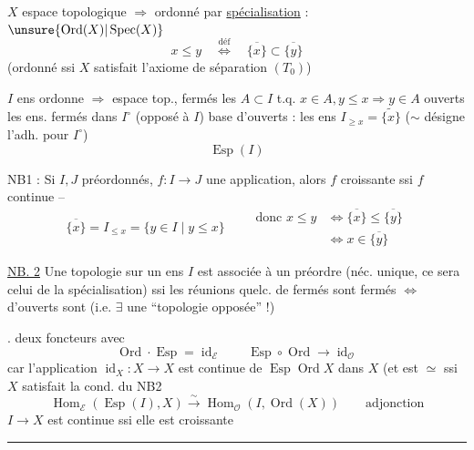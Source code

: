 
$X$ espace topologique $\Longrightarrow$ ordonné par \uline{spécialisation} : $\unsure{\operatorname{Ord}(X)|\operatorname{Spec}(X)}$
\[
x\leq y\quad\overset{\mathrm{déf}}{\Longleftrightarrow}\quad\overline{\{x\}}\subset\overline{\{y\}}
\]
(ordonné ssi $X$ satisfait l'axiome de séparation $(T_0)$)

$I$ ens ordonne $\Longrightarrow$ espace top., fermés les $A\subset I$ t.q. $x\in A,y\leq x\Rightarrow y\in A$
ouverts les ens. fermés dans $I^\circ$ (opposé à $I$)
base d'ouverts : les ens $I_{\geq x}=\widetilde{\{x\}}$ ($\sim$ désigne l'adh. pour $I^\circ$)
\[
\operatorname{Esp}(I)
\]

NB1 : Si $I,J$ préordonnés, $f:I\longrightarrow J$
une application, alors $f$ croissante ssi
$f$ continue --
\[
\overline{\{x\}}=I_{\leq x}=\{y\in I\mid y\leq x\}\qquad
\begin{aligned}
\text{donc }x\leq y&\Longleftrightarrow\overline{\{x\}}\leq\overline{\{y\}}\\
&\Longleftrightarrow x\in\overline{\{y\}}
\end{aligned}
\]

\uline{NB. 2} Une topologie sur un ens $I$ est associée à
un préordre (néc. unique,  ce sera celui de
la spécialisation) ssi les réunions quelc. de
fermés sont fermés $\Longleftrightarrow$  d'ouverts
sont  (i.e. $\exists$ une ``topologie opposée'' !)

. deux foncteurs
avec
\[
\operatorname{Ord}\cdot\operatorname{Esp}=\operatorname{id}_{\mathcal E}
\qquad
\operatorname{Esp}\circ\operatorname{Ord}\longrightarrow\operatorname{id}_{\mathcal O}
\]
car l'application $\operatorname{id}_X:X\longrightarrow X$
est continue de $\operatorname{Esp}\operatorname{Ord}X$
dans $X$ (et est $\simeq$ ssi $X$
satisfait la cond. du NB2
\[
\operatorname{Hom}_{\mathcal E}(\operatorname{Esp}(I),X)\xrightarrow{\sim}
\operatorname{Hom}_{\mathcal O}(I,\operatorname{Ord}(X))\qquad\text{adjonction}
\]
$I\longrightarrow X$ est continue ssi elle est croissante
\par\noindent\rule{2cm}{0.4pt}

